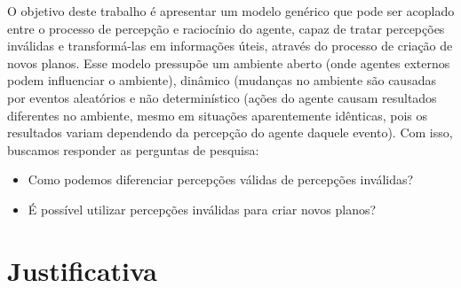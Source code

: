 O objetivo deste trabalho é apresentar um modelo genérico que pode ser acoplado entre o processo de percepção e raciocínio do agente, capaz de tratar percepções inválidas e transformá-las em informações úteis, através do processo de criação de novos planos. Esse modelo pressupõe um ambiente aberto (onde agentes externos podem influenciar o ambiente), dinâmico (mudanças no ambiente são causadas por eventos aleatórios e não determinístico (ações do agente causam resultados diferentes no ambiente, mesmo em situações aparentemente idênticas, pois os resultados variam dependendo da percepção do agente daquele evento).  Com isso, buscamos responder as perguntas de pesquisa:

\begin{itemize}
    \item Como podemos diferenciar percepções válidas de percepções inválidas?
    \item É possível utilizar percepções inválidas para criar novos planos?
\end{itemize}

\iffalse

Agentes são baseados em arquiteturas cognitivas, \emph{frameworks} criados para simular a cognição humana \cite{newell1994unified}.

Um exemplo de arquitetura cognitiva é o modelo \emph{belief-desire-intention} (BDI), originado na psicologia com a teoria do raciocínio prático de Bratman \cite{bratman1987intention}, posteriormente implementado como um modelo computacional por Rao \cite{rao1995bdi}. No BDI, os estados internos do agente são divididos em crenças, desejos e intenções. Crenças são todo o conhecimento que o agente possui a respeito do mundo, recebidos da percepção do ambiente e de comunicações com outros agentes ou outras fontes externas. Desejos são as mudanças que o agente deseja causar no mundo, e as intenções representam os estados deliberativos do agente, ou seja, coisas que o agente efetivamente se dispôs a fazer.



\fi


\section{Justificativa}

